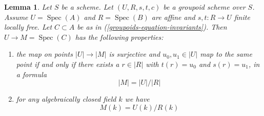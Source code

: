 \documentclass{amsart}
\theoremstyle{plain}
\newtheorem{lemma}[subsection]{Lemma}
\theoremstyle{definition}
\theoremstyle{remark}
\numberwithin{equation}{subsection}
\def\Spec{\mathop{\mathrm{Spec}}}
\begin{document}
\begin{lemma}
\label{groupoids-lemma-points}
Let $S$ be a scheme. Let $(U, R, s, t, c)$ be a groupoid scheme over $S$.
Assume $U = \Spec(A)$ and $R = \Spec(B)$ are affine and
$s, t : R \to U$ finite locally free. Let $C \subset A$ be as in
(\ref{groupoids-equation-invariants}). Then $U \to M = \Spec(C)$ has
the following properties:
\begin{enumerate}
\item the map on points $|U| \to |M|$ is surjective and
$u_0, u_1 \in |U|$ map to the same point if and only if
there exists a $r \in |R|$ with $t(r) = u_0$ and $s(r) = u_1$, in
a formula
$$
|M| = |U|/|R|
$$
\item for any algebraically closed field $k$ we have
$$
M(k) = U(k)/R(k)
$$
\end{enumerate}
\end{lemma}
\end{document}
